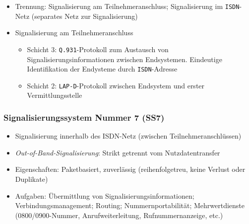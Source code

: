 \begin{itemize}
	\begin{itemize}
		\item Trennung: Signalisierung am Teilnehmeranschluss; Signalisierung im \texttt{ISDN}-Netz (separates Netz zur Signalisierung)
		\item Signalisierung am Teilnehmeranschluss
		\begin{itemize}
			\item Schicht 3: \texttt{Q.931}-Protokoll zum Austausch von Signalisierungsinformationen zwischen Endsystemen. Eindeutige Identifikation der Endysteme durch \texttt{ISDN}-Adresse
			\item Schicht 2: \texttt{LAP-D}-Protokoll zwischen Endsystem und erster Vermittlungsstelle
		\end{itemize}
	\end{itemize}
\end{itemize}

\subsubsection{Signalisierungssystem Nummer 7 (SS7)}
\begin{itemize}
	\item Signalisierung innerhalb des ISDN-Netz (zwischen Teilnehmeranschlüssen)
	\item \textit{Out-of-Band-Signalisierung}: Strikt getrennt vom Nutzdatentransfer
	\item Eigenschaften: Paketbasiert, zuverlässig (reihenfolgetreu, keine Verlust oder Duplikate)
	\item Aufgaben: Übermittlung von Signalisierungsinformationen; Verbindungsmanagement; Routing; Nummernportabilität; Mehrwertdienste (0800/0900-Nummer, Anrufweiterleitung, Rufnummernanzeige, etc.)
\end{itemize}


